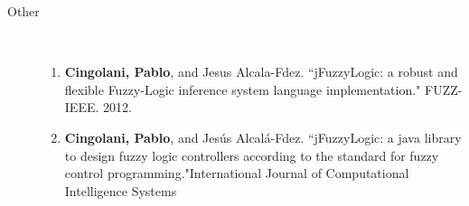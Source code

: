 \begin{description}
	\item[Other] ~

		\begin{enumerate}[resume]
			\item \textbf{Cingolani, Pablo}, and Jesus Alcala-Fdez. ``jFuzzyLogic: a robust and flexible Fuzzy-Logic inference system language implementation." FUZZ-IEEE. 2012.
			\item \textbf{Cingolani, Pablo}, and Jesús Alcalá-Fdez. ``jFuzzyLogic: a java library to design fuzzy logic controllers according to the standard for fuzzy control programming."International Journal of Computational Intelligence Systems 
		\end{enumerate}	

\end{description}
